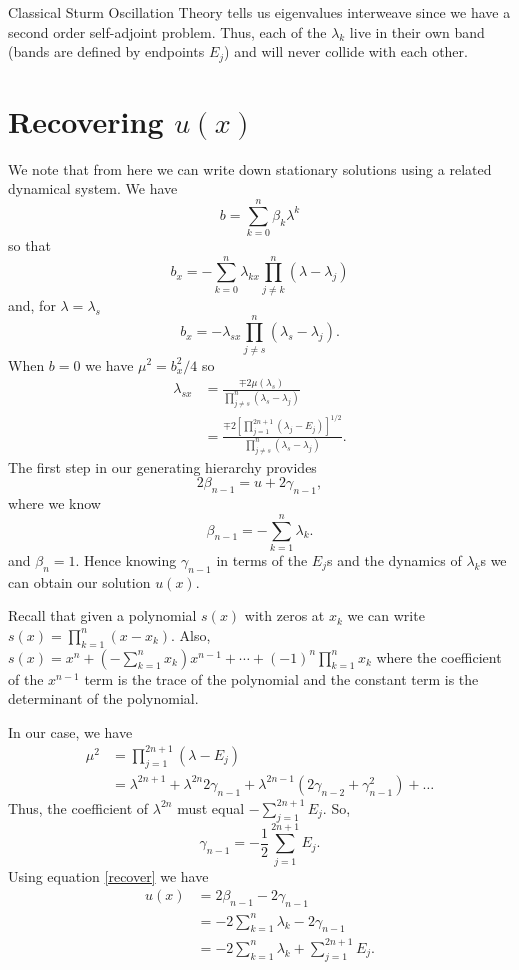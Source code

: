 \documentclass[12pt, a4paper]{article}
\begin{document}
Classical Sturm Oscillation Theory tells us eigenvalues interweave since
we have a second order self-adjoint problem.  Thus, each of the
$\lambda_k$ live in their own band (bands are defined by endpoints
$E_j$) and will never collide with each other.



\section{Recovering $u(x)$}



We note that from here we can write down stationary solutions using a
related dynamical system. We have
\[
  b = \sum_{k=0}^n \beta_k \lambda^k
\]
so that
\[
  b_x = -\sum_{k=0}^n \lambda_{kx} \prod^n_{j\ne k} (\lambda - \lambda_j)
\]
and, for $\lambda = \lambda_s$
\[
  b_x = -\lambda_{sx} \prod^n_{j\ne s} (\lambda_s - \lambda_j).
\]
When $b = 0$ we have $\mu^2 = b_x^2/4$ so
\begin{align*}
  \lambda_{sx}
  &=
  \frac{
    \mp 2 \mu (\lambda_s)
  }{
    \prod^n_{j\ne s}(\lambda_s - \lambda_j)
  } \\
  &=
  \frac{
    \mp 2 \left[
      \prod_{j=1}^{2n+1} (\lambda_j - E_j)
      \right]^{1/2}
  }{
    \prod^n_{j\ne s} (\lambda_s - \lambda_j)
  }.
\end{align*}
The first step in our generating hierarchy provides
\begin{equation}\label{recover}
  2\beta_{n-1} = u + 2\gamma_{n-1},
\end{equation}
where we know
\[
  \beta_{n-1} = -\sum_{k=1}^n \lambda_k.
\]
and $\beta_n=1$. Hence knowing $\gamma_{n-1}$ in terms of the $E_j$s and
the dynamics of $\lambda_k$s we can obtain our solution $u(x)$.

Recall that given a polynomial $s(x)$ with zeros at $x_k$ we can write
$s(x) = \prod_{k=1}^n (x-x_k)$.  Also, $s(x) = x^n + \left(
-\sum_{k=1}^n x_k \right) x^{n-1} + \cdots + (-1)^n \prod_{k=1}^n x_k$
where the coefficient of the $x^{n-1}$ term is the trace of the
polynomial and the constant term is the determinant of the polynomial.

In our case, we have
\begin{align*}
  \mu^2
  &=
  \prod_{j=1}^{2n+1} (\lambda-E_j) \\
  &=
  \lambda^{2n+1} + \lambda^{2n} 2\gamma_{n-1} + \lambda^{2n-1}
  \left( 2\gamma_{n-2} + \gamma_{n-1}^2 \right) + \ldots
\end{align*}
Thus, the coefficient of $\lambda^{2n}$ must equal
$-\sum_{j=1}^{2n+1}E_j$.  So,
\[
  \gamma_{n-1} = -\frac{1}{2} \sum_{j=1}^{2n+1} E_j.
\]
Using equation \eqref{recover} we have
\begin{align*}
  u(x)
  &=
  2\beta_{n-1} - 2\gamma_{n-1} \\
  &=
  -2\sum_{k=1}^n \lambda_k - 2\gamma_{n-1} \\
  &=
  -2\sum_{k=1}^n \lambda_k + \sum_{j=1}^{2n+1} E_j.
\end{align*}
\end{document}
